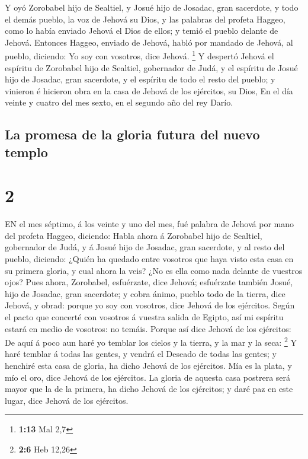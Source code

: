  Y oyó Zorobabel hijo de Sealtiel, y Josué hijo de Josadac,
gran sacerdote, y todo el demás pueblo, la voz de Jehová su Dios, y las
palabras del profeta Haggeo, como lo había enviado Jehová el Dios de
ellos; y temió el pueblo delante de Jehová.  Entonces
Haggeo, enviado de Jehová, habló por mandado de Jehová, al pueblo,
diciendo: Yo soy con vosotros, dice Jehová. \footnote{\textbf{1:13} Mal
  2,7}  Y despertó Jehová el espíritu de Zorobabel hijo de
Sealtiel, gobernador de Judá, y el espíritu de Josué hijo de Josadac,
gran sacerdote, y el espíritu de todo el resto del pueblo; y vinieron é
hicieron obra en la casa de Jehová de los ejércitos, su Dios,
 En el día veinte y cuatro del mes sexto, en el segundo año
del rey Darío.

\hypertarget{la-promesa-de-la-gloria-futura-del-nuevo-templo}{%
\subsection{La promesa de la gloria futura del nuevo
templo}\label{la-promesa-de-la-gloria-futura-del-nuevo-templo}}

\hypertarget{section-1}{%
\section{2}\label{section-1}}

 EN el mes séptimo, á los veinte y uno del mes, fué palabra
de Jehová por mano del profeta Haggeo, diciendo:  Habla
ahora á Zorobabel hijo de Sealtiel, gobernador de Judá, y á Josué hijo
de Josadac, gran sacerdote, y al resto del pueblo, diciendo:
 ¿Quién ha quedado entre vosotros que haya visto esta casa
en su primera gloria, y cual ahora la veis? ¿No es ella como nada
delante de vuestros ojos?  Pues ahora, Zorobabel,
esfuérzate, dice Jehová; esfuérzate también Josué, hijo de Josadac, gran
sacerdote; y cobra ánimo, pueblo todo de la tierra, dice Jehová, y
obrad: porque yo soy con vosotros, dice Jehová de los ejércitos.
 Según el pacto que concerté con vosotros á vuestra salida
de Egipto, así mi espíritu estará en medio de vosotros: no temáis.
 Porque así dice Jehová de los ejércitos: De aquí á poco aun
haré yo temblar los cielos y la tierra, y la mar y la seca: \footnote{\textbf{2:6}
  Heb 12,26}  Y haré temblar á todas las gentes, y vendrá el
Deseado de todas las gentes; y henchiré esta casa de gloria, ha dicho
Jehová de los ejércitos.  Mía es la plata, y mío el oro,
dice Jehová de los ejércitos.  La gloria de aquesta casa
postrera será mayor que la de la primera, ha dicho Jehová de los
ejércitos; y daré paz en este lugar, dice Jehová de los ejércitos.

